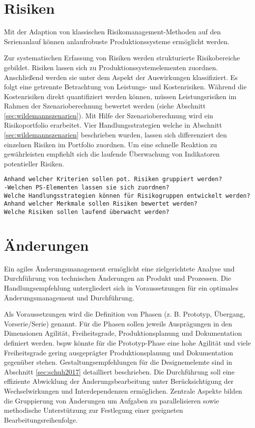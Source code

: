 \section{Risiken}

Mit der Adaption von klassischen Risikomanagement-Methoden auf den Serienanlauf können anlaufrobuste Produktionssysteme ermöglicht werden. 

Zur systematischen Erfassung von Risiken werden strukturierte Risikobereiche gebildet. Risiken lassen sich zu Produktionssystemelementen zuordnen. Anschließend werden sie unter dem Aspekt der Auswirkungen klassifiziert. Es folgt eine getrennte Betrachtung von Leistungs- und Kostenrisiken. 
Während die Kostenrisiken direkt quantifiziert werden können, müssen Leistungsrisiken im Rahmen der Szenarioberechnung bewertet werden (siehe Abschnitt \ref{sec:wildemannszenarien}).
Mit Hilfe der Szenarioberechnung wird ein Risikoportfolio erarbeitet. Vier Handlungsstrategien welche in Abschnitt  \ref{sec:wildemannszenarien} beschrieben wurden, lassen sich differenziert den einzelnen Risiken im Portfolio zuordnen.
Um eine schnelle Reaktion zu gewährleisten empfiehlt sich die laufende Überwachung von Indikatoren potentieller Risiken. 

\begin{verbatim}
Anhand welcher Kriterien sollen pot. Risiken gruppiert werden?
-Welchen PS-Elementen lassen sie sich zuordnen? 
Welche Handlungsstrategien können für Risikogruppen entwickelt werden?
Anhand welcher Merkmale sollen Risiken bewertet werden?
Welche Risiken sollen laufend überwacht werden?
\end{verbatim}

\section{Änderungen}

Ein agiles Änderungsmanagement ermöglicht eine zielgerichtete Analyse und Durchführung von technischen Änderungen an Produkt und Prozessen. Die Handlungsempfehlung untergliedert sich in Voraussetzungen für ein optimales Änderungsmanagement und  Durchführung. %

Als Voraussetzungen wird die Definition von Phasen (z. B. Prototyp, Übergang, Vorserie/Serie) genannt. Für die Phasen sollen jeweils Ausprägungen in den Dimensionen Agilität, Freiheitsgrade, Produktionsplanung und Dokumentation definiert werden. \Gls{bspw} könnte für die Prototyp-Phase eine hohe Agilität und viele Freiheitsgrade gering ausgeprägter Produktionsplanung und Dokumentation gegenüber stehen. Gestaltungsempfehlungen für die Designemelemte sind in Abschnitt \ref{sec:schuh2017} detailliert beschrieben. 
Die Durchführung soll eine effiziente Abwicklung der Änderungsbearbeitung unter Berücksichtigung der Wechselwirkungen und Interdependenzen ermöglichen. Zentrale Aspekte bilden die Gruppierung von Änderungen um Aufgaben zu parallelisieren sowie methodische Unterstützung zur Festlegung einer geeigneten Bearbeitungsreihenfolge. 


